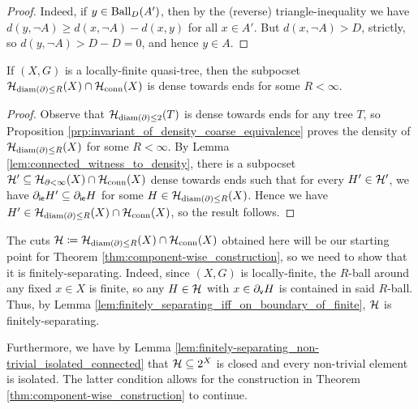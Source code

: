 \documentclass[reqno]{amsart}
\begin{document}
\begin{proof}
        Indeed, if $y\in\operatorname{Ball}_D(A')$, then by the (reverse) triangle-inequality we have $d(y,\lnot A)\geq d(x,\lnot A)-d(x,y)$ for all $x\in A'$. But $d(x,\lnot A)>D$, strictly, so $d(y,\lnot A)>D-D=0$, and hence $y\in A$.
    \end{proof}

    \begin{corollary}\label{cor:density_of_bounded_diameter_boundary_cuts_quasi_tree}
        If $(X,G)$ is a locally-finite quasi-tree, then the subpocset $\mathcal{H}_{\operatorname{diam}(\partial)\leq R}(X)\cap\mathcal{H}_\mathrm{conn}(X)$ is dense towards ends for some $R<\infty$.
    \end{corollary}
    \begin{proof}
        Observe that $\mathcal{H}_{\operatorname{diam}(\partial)\leq2}(T)$ is dense towards ends for any tree $T$, so Proposition \ref{prp:invariant_of_density_coarse_equivalence} proves the density of $\mathcal{H}_{\operatorname{diam}(\partial)\leq R}(X)$ for some $R<\infty$. By Lemma \ref{lem:connected_witness_to_density}, there is a subpocset $\mathcal{H}'\subseteq\mathcal{H}_{\partial<\infty}(X)\cap\mathcal{H}_\mathrm{conn}(X)$ dense towards ends such that for every $H'\in\mathcal{H}'$, we have $\partial_\mathsf{ie}H'\subseteq\partial_\mathsf{ie}H$ for some $H\in\mathcal{H}_{\operatorname{diam}(\partial)\leq R}(X)$. Hence we have $H'\in\mathcal{H}_{\operatorname{diam}(\partial)\leq R}(X)\cap\mathcal{H}_\mathrm{conn}(X)$, so the result follows.
    \end{proof}

    The cuts $\mathcal{H}\coloneqq\mathcal{H}_{\operatorname{diam}(\partial)\leq R}(X)\cap\mathcal{H}_\mathrm{conn}(X)$ obtained here will be our starting point for Theorem \ref{thm:component-wise_construction}, so we need to show that it is finitely-separating. Indeed, since $(X,G)$ is locally-finite, the $R$-ball around any fixed $x\in X$ is finite, so any $H\in\mathcal{H}$ with $x\in\partial_\mathsf{v}H$ is contained in said $R$-ball. Thus, by Lemma \ref{lem:finitely_separating_iff_on_boundary_of_finite}, $\mathcal{H}$ is finitely-separating.

    Furthermore, we have by Lemma \ref{lem:finitely-separating_non-trivial_isolated_connected} that $\mathcal{H}\subseteq2^X$ is closed and every non-trivial element is isolated. The latter condition allows for the construction in Theorem \ref{thm:component-wise_construction} to continue.

\end{document}
